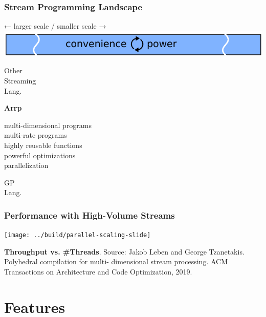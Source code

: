 \documentclass{beamer}
\begin{document}
\begin{frame}[t, fragile]
\frametitle{Stream Programming Landscape}

\begin{center}
← larger scale / smaller scale →
\includegraphics[width=\textwidth]{../figures/landscape_after_arrp}
\end{center}
\begin{minipage}[t]{0.2\linewidth}
Other\\Streaming\\Lang.
\end{minipage}\hfill
\begin{minipage}[t]{0.55\linewidth}
\begin{center}
\textbf{Arrp}

\vspace{10pt}
multi-dimensional programs\\
multi-rate programs\\
highly reusable functions\\
powerful optimizations\\
parallelization
\end{center}
\end{minipage}\hfill
\begin{minipage}[t]{0.2\linewidth}
\flushright
GP\\Lang.
\end{minipage}

\end{frame}

\begin{frame}[fragile]
\frametitle{Performance with High-Volume Streams}
\texttt{[image: ../build/parallel-scaling-slide]}

\footnotesize
\textbf{Throughput vs. \#Threads}. Source: Jakob Leben and George Tzanetakis. Polyhedral compilation for multi-
dimensional stream processing. ACM Transactions on Architecture and Code
Optimization, 2019.
\end{frame}

\section{Features}
\end{document}
